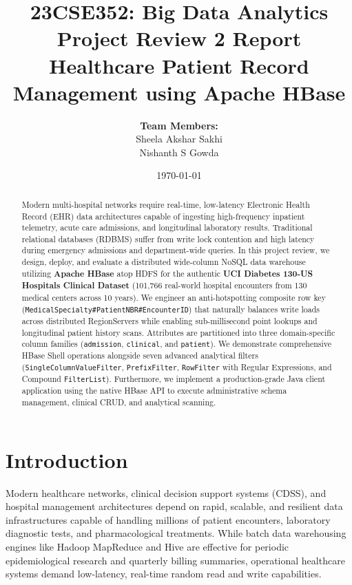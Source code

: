 \documentclass[12pt, a4paper]{article}
\title{\textbf{23CSE352: Big Data Analytics}\\ \Large Project Review 2 Report \\ \vspace{0.4cm} \Large \textbf{Healthcare Patient Record Management using Apache HBase}}
\author{\textbf{Team Members:}\\ Sheela Akshar Sakhi \\ Nishanth S Gowda}
\date{\today}
\begin{document}
\maketitle
\begin{abstract}
Modern multi-hospital networks require real-time, low-latency Electronic Health Record (EHR) data architectures capable of ingesting high-frequency inpatient telemetry, acute care admissions, and longitudinal laboratory results. Traditional relational databases (RDBMS) suffer from write lock contention and high latency during emergency admissions and department-wide queries. In this project review, we design, deploy, and evaluate a distributed wide-column NoSQL data warehouse utilizing \textbf{Apache HBase} atop HDFS for the authentic \textbf{UCI Diabetes 130-US Hospitals Clinical Dataset} (101,766 real-world hospital encounters from 130 medical centers across 10 years). We engineer an anti-hotspotting composite row key (\texttt{MedicalSpecialty\#PatientNBR\#EncounterID}) that naturally balances write loads across distributed RegionServers while enabling sub-millisecond point lookups and longitudinal patient history scans. Attributes are partitioned into three domain-specific column families (\texttt{admission}, \texttt{clinical}, and \texttt{patient}). We demonstrate comprehensive HBase Shell operations alongside seven advanced analytical filters (\texttt{SingleColumnValueFilter}, \texttt{PrefixFilter}, \texttt{RowFilter} with Regular Expressions, and Compound \texttt{FilterList}). Furthermore, we implement a production-grade Java client application using the native HBase API to execute administrative schema management, clinical CRUD, and analytical scanning.
\end{abstract}

\tableofcontents
\newpage

\section{Introduction}
Modern healthcare networks, clinical decision support systems (CDSS), and hospital management architectures depend on rapid, scalable, and resilient data infrastructures capable of handling millions of patient encounters, laboratory diagnostic tests, and pharmacological treatments. While batch data warehousing engines like Hadoop MapReduce and Hive are effective for periodic epidemiological research and quarterly billing summaries, operational healthcare systems demand low-latency, real-time random read and write capabilities.
\end{document}
